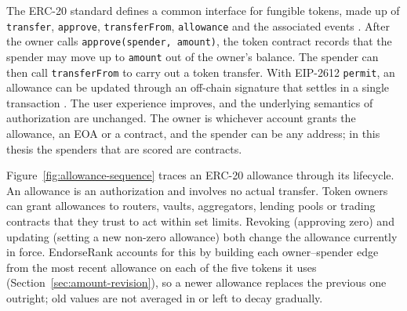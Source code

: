 The ERC-20 standard defines a common interface for fungible tokens, made up of \texttt{transfer}, \texttt{approve}, \texttt{transferFrom}, \texttt{allowance} and the associated events \parencite{vogelsteller2015erc20}. After the owner calls \texttt{approve(spender, amount)}, the token contract records that the spender may move up to \texttt{amount} out of the owner's balance. The spender can then call \texttt{transferFrom} to carry out a token transfer. With EIP-2612 \texttt{permit}, an allowance can be updated through an off-chain signature that settles in a single transaction \parencite{lundfall2020permit}. The user experience improves, and the underlying semantics of authorization are unchanged. The owner is whichever account grants the allowance, an EOA or a contract, and the spender can be any address; in this thesis the spenders that are scored are contracts.

Figure~\ref{fig:allowance-sequence} traces an ERC-20 allowance through its lifecycle. An allowance is an authorization and involves no actual transfer. Token owners can grant allowances to routers, vaults, aggregators, lending pools or trading contracts that they trust to act within set limits. Revoking (approving zero) and updating (setting a new non-zero allowance) both change the allowance currently in force. EndorseRank accounts for this by building each owner--spender edge from the most recent allowance on each of the five tokens it uses (Section~\ref{sec:amount-revision}), so a newer allowance replaces the previous one outright; old values are not averaged in or left to decay gradually.

